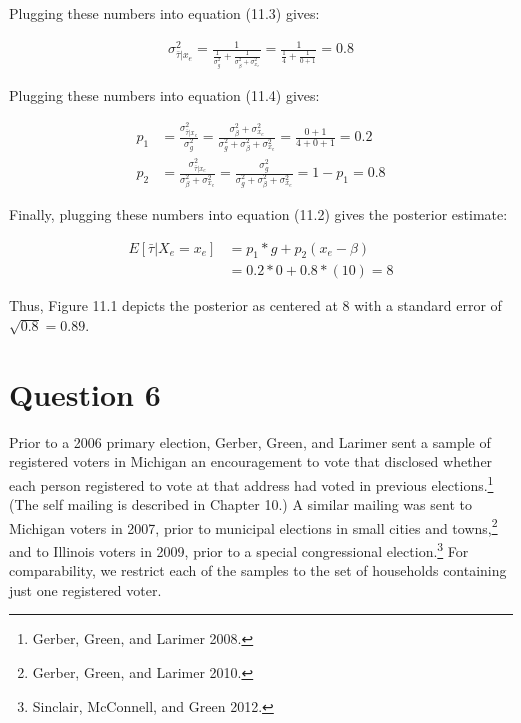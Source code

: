 \documentclass[11pt,notitlepage]{article}\usepackage[]{graphicx}\usepackage[]{color}
\begin{document}
Plugging these numbers into equation (11.3) gives: 

 \begin{align*}
\sigma^2_{\bar{\tau}|x_e} = \frac{1}{\frac{1}{\sigma^2_g} + \frac{1}{\sigma^2_{\beta} + \sigma^2_{x_e}}} = \frac{1}{\frac{1}{4} + \frac{1}{0+1}} = 0.8
\end{align*}
 
Plugging these numbers into equation (11.4) gives: 

\begin{align*}
p_1 &= \frac{\sigma^2_{\bar{\tau}|x_e}}{\sigma^2_g} = \frac{\sigma^2_{\beta} + \sigma^2_{x_e}}{\sigma^2_g +\sigma^2_{\beta} + \sigma^2_{x_e}} = \frac{0+1}{4+0+1} = 0.2\\
p_2 &= \frac{\sigma^2_{\bar{\tau}|x_e}}{\sigma^2_{\beta} + \sigma^2_{x_e}} = \frac{\sigma^2_g}{\sigma^2_g +\sigma^2_{\beta} + \sigma^2_{x_e}} = 1 - p_1 = 0.8
\end{align*}

Finally, plugging these numbers into equation (11.2) gives the posterior estimate:

\begin{align*}
E[\bar{\tau}|X_e = x_e] &= p_1*g + p_2(x_e - \beta) \\
&= 0.2 * 0 + 0.8*(10) = 8
\end{align*}

Thus, Figure 11.1 depicts the posterior as centered at 8 with a standard error of $\sqrt{0.8}=0.89$.

\section*{Question 6}
Prior to a 2006 primary election, Gerber, Green, and Larimer sent a sample of registered voters in Michigan an encouragement to vote that disclosed whether each person registered to vote at that address had voted in previous elections.\footnote{Gerber, Green, and Larimer 2008.} (The self mailing is described in Chapter 10.) A similar mailing was sent to Michigan voters in 2007, prior to municipal elections in small cities and towns,\footnote{Gerber, Green, and Larimer 2010.} and to Illinois voters in 2009, prior to a special congressional election.\footnote{Sinclair, McConnell, and Green 2012.} For comparability, we restrict each of the samples to the set of households containing just one registered voter.
\end{document}
